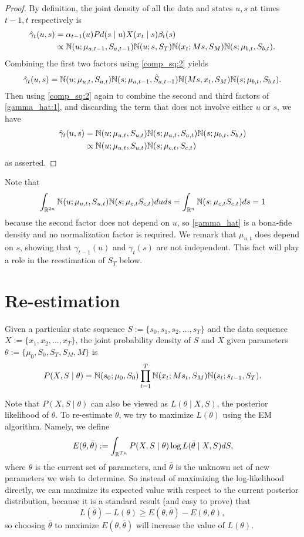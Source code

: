 \documentclass[12pt,leqno]{article}
\begin{document}
\begin{proof}
  By definition, the joint density of all the data and states $u,s$ at times $t-1,t$ respectively is 
  \begin{align*}
    \hat{\gamma}_t(u,s) &= \alpha_{t-1}(u)Pd(s\mid u)X(x_t\mid s)\beta_t(s) \\
    &\propto {\mathbb N}(u;\mu_{a,t-1},S_{a,t-1}){\mathbb N}(u;s,S_T){\mathbb N}(x_t;Ms,S_M){\mathbb N}(s;\mu_{b,t},S_{b,t}).
  \end{align*}
  Combining the first two factors using \eqref{comp_sq:2} yields
  \begin{equation}\label{gamma_hat:1}
    \hat{\gamma}_t(u,s) = {\mathbb N}(u;\mu_{u,t},S_{u,t}){\mathbb N}(s;\mu_{a,t-1},\hat{S}_{a,t-1}){\mathbb N}(Ms,x_t,S_M){\mathbb N}(s;\mu_{b,t},S_{b,t}).
  \end{equation}
  Then using \eqref{comp_sq:2} again to combine the second and third factors of \eqref{gamma_hat:1}, and discarding
  the term that does not involve either $u$ or $s$, we have
    \begin{align*}
      \hat{\gamma}_t(u,s) &= {\mathbb N}(u;\mu_{u,t},S_{u,t}){\mathbb N}(s;\mu_{a,t},S_{a,t}){\mathbb N}(s;\mu_{b,t},S_{b,t})\\
      &\propto {\mathbb N}(u;\mu_{u,t},S_{u,t}){\mathbb N}(s;\mu_{c,t},S_{c,t})
    \end{align*}
    as asserted.
    \end{proof}
  Note that
  $$
  \int_{{\mathbb R}^{2n}}{\mathbb N}(u;\mu_{u,t},S_{u,t}){\mathbb N}(s;\mu_{c,t}S_{c,t})duds = \int_{{\mathbb R}^n}{\mathbb N}(s;\mu_{c,t}S_{c,t})ds = 1 
  $$
  because the second factor does not depend on $u$, so \eqref{gamma_hat} is a bona-fide density and no
  normalization factor is required.  We remark that $\mu_{u,t}$ does depend on $s$, showing that $\gamma_{t-1}(u)$
  and $\gamma_t(s)$ are not independent.  This fact will play a role in the reestimation of $S_T$ below.
  
\section{Re-estimation}
Given a particular state sequence $S := \{s_0,s_1,s_2,\dots,s_T\}$ and the data sequence $X := \{x_1,x_2,\dots,x_T\}$,
the joint probability density of $S$ and $X$ given parameters $\theta := \{\mu_0,S_0,S_T,S_M,M\}$ is
$$
P(X,S\mid\theta) = {\mathbb N}(s_0;\mu_0,S_0)\prod_{t=1}^T{\mathbb N}(x_t;Ms_t,S_M){\mathbb N}(s_t;s_{t-1},S_T).
$$

Note that $P(X,S\mid\theta)$ can also be viewed as  $L(\theta\mid X,S)$, the posterior likelihood of $\theta$.
To re-estimate $\theta$, we try to maximize $L(\theta)$ using the EM algorithm. Namely, we define 
$$
E(\theta,\bar{\theta}) := \int_{{\mathbb R}^{Tn}}P(X,S\mid\theta)\log{L(\bar{\theta}\mid X,S)}dS,
$$
where $\theta$ is the current set of parameters, and $\bar{\theta}$ is the unknown set of new parameters
we wish to determine. So instead of maximizing the log-likelihood directly, we can maximize its expected
value with respect to the current posterior distribution, because it is a standard result (and easy to prove) that
$$
L(\bar{\theta}) - L(\theta) \ge E(\theta,\bar{\theta}) - E(\theta,\theta),
$$
so choosing $\bar{\theta}$ to maximize $E(\theta,\bar{\theta})$ will increase the value of $L(\theta)$.
\end{document}
